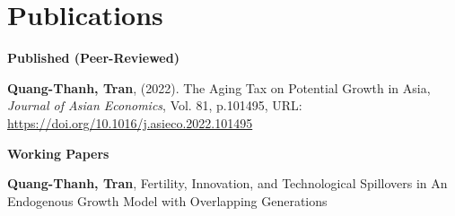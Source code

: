 \section{\sc Publications}
{\bf Published (Peer-Reviewed)}
\vspace*{.05in}
\begin{etaremune}[]
\item
  {\bf Quang-Thanh, Tran},
  (2022).
  {The Aging Tax on Potential Growth in Asia},
  {\it Journal of Asian Economics}, Vol. 81, p.101495,
  {URL: \url{https://doi.org/10.1016/j.asieco.2022.101495}}
\end{etaremune}

\vspace{4mm}

{\bf Working Papers}
\vspace*{.05in}
\begin{etaremune}[]
\item
  {\bf Quang-Thanh, Tran},
  {Fertility, Innovation, and Technological Spillovers  in An Endogenous Growth Model with Overlapping Generations}
\end{etaremune}


